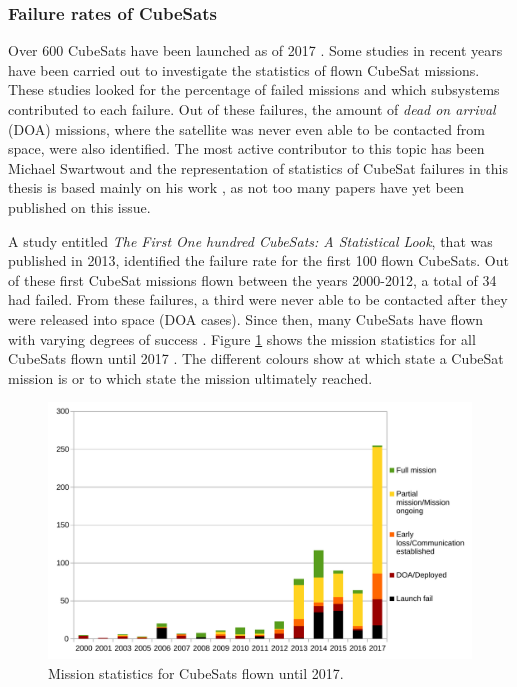 \documentclass[english,12pt,a4paper,pdftex,elec,utf8]{aaltothesis}
\begin{document}
\subsubsection{Failure rates of CubeSats}
Over 600 CubeSats have been launched as of 2017 \cite{Swart2017kalvo}. Some studies in recent years have been carried out to investigate the statistics of flown CubeSat missions. These studies looked for the percentage of failed missions and which subsystems contributed to each failure. Out of these failures, the amount of \textit{dead on arrival} (DOA) missions, where the satellite was never even able to be contacted from space, were also identified. The most active contributor to this topic has been Michael Swartwout and the representation of statistics of CubeSat failures in this thesis is based mainly on his work \cite{Swart2016, Swart1, Swart2015}, as not too many papers have yet been published on this issue.\par 
A study entitled \textit{The First One hundred CubeSats: A Statistical Look}, that was published in 2013, identified the failure rate for the first 100 flown CubeSats. Out of these first CubeSat missions flown between the years 2000-2012, a total of 34 had failed. From these failures, a third were never able to be contacted after they were released into space (DOA cases). Since then, many CubeSats have flown with varying degrees of success \cite{Swart2016}. Figure \ref{100first} shows the mission statistics for all CubeSats flown until 2017 \cite{csdatabase}. The different colours show at which state a CubeSat mission is or to which state the mission ultimately reached. \par
\begin{figure}[h!]
\centering
\includegraphics[scale=0.6]{cfdnew}
\caption{Mission statistics for CubeSats flown until 2017. \cite{csdatabase}}
\label{100first}
\end{figure} 
\end{document}
